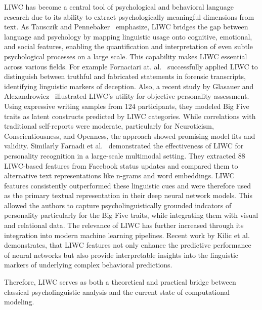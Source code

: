 LIWC has become a central tool of psychological and behavioral language research due to its ability to extract psychologically meaningful dimensions from text. As Tausczik and Pennebaker~\cite{tausczik2010psychological} emphasize, LIWC bridges the gap between language and psychology by mapping linguistic usage onto cognitive, emotional, and social features, enabling the quantification and interpretation of even subtle psychological processes on a large scale. This capability makes LIWC essential across various fields. For example Fornaciari at. al.~\cite{fornaciari2013automatic} successfully applied LIWC to distinguish between truthful and fabricated statements in forensic transcripts, identifying linguistic markers of deception. Also, a recent study by Glasauer and Alexandrowicz~\cite{glasauer2022bigfive} illustrated LIWC’s utility for objective personality assessment. Using expressive writing samples from 124 participants, they modeled Big Five traits as latent constructs predicted by LIWC categories. While correlations with traditional self-reports were moderate, particularly for Neuroticism, Conscientiousness, and Openness, the approach showed promising model fits and validity. Similarly Farnadi et al.~\cite{farnadi2018user} demonstrated the effectiveness of LIWC for personality recognition in a large-scale multimodal setting. They extracted 88 LIWC-based features from Facebook status updates and compared them to alternative text representations like n-grams and word embeddings. LIWC features consistently outperformed these linguistic cues and were therefore used as the primary textual representation in their deep neural network models. This allowed the authors to capture psycholinguistically grounded indcators of personality particularly for the Big Five traits, while integrating them with visual and relational data. The relevance of LIWC has further increased through its integration into modern machine learning pipelines. Recent work by Kilic et al.~\cite{yakut-kilic-pan-2022-incorporating} demonstrates, that LIWC  features not only enhance the predictive performance of neural networks but also provide interpretable insights into the linguistic markers of underlying complex behavioral predictions.

Therefore, LIWC serves as both a theoretical and practical bridge between classical psycholinguistic analysis and the current state of computational modeling. 



